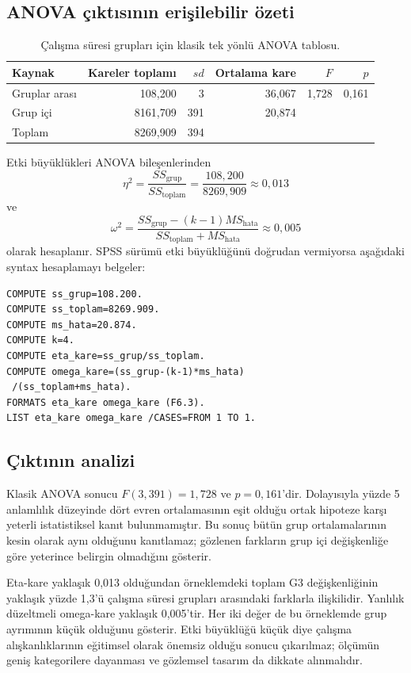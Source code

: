\subsection{ANOVA çıktısının erişilebilir özeti}

\begin{table}[htbp]
\centering
\caption{Çalışma süresi grupları için klasik tek yönlü ANOVA tablosu.}
\small
\begin{tabular}{@{}lrrrrr@{}}
\toprule
Kaynak & Kareler toplamı & $sd$ & Ortalama kare & $F$ & $p$ \\
\midrule
Gruplar arası & 108,200 & 3 & 36,067 & 1,728 & 0,161 \\
Grup içi & 8161,709 & 391 & 20,874 & & \\
Toplam & 8269,909 & 394 & & & \\
\bottomrule
\end{tabular}
\end{table}

Etki büyüklükleri ANOVA bileşenlerinden
\[
\eta^2=\frac{SS_{\mathrm{grup}}}{SS_{\mathrm{toplam}}}
=\frac{108{,}200}{8269{,}909}\approx0{,}013
\]
ve
\[
\omega^2=
\frac{SS_{\mathrm{grup}}-(k-1)MS_{\mathrm{hata}}}
{SS_{\mathrm{toplam}}+MS_{\mathrm{hata}}}
\approx0{,}005
\]
olarak hesaplanır. SPSS sürümü etki büyüklüğünü doğrudan vermiyorsa aşağıdaki
syntax hesaplamayı belgeler:

\begin{lstlisting}[language={}]
COMPUTE ss_grup=108.200.
COMPUTE ss_toplam=8269.909.
COMPUTE ms_hata=20.874.
COMPUTE k=4.
COMPUTE eta_kare=ss_grup/ss_toplam.
COMPUTE omega_kare=(ss_grup-(k-1)*ms_hata)
 /(ss_toplam+ms_hata).
FORMATS eta_kare omega_kare (F6.3).
LIST eta_kare omega_kare /CASES=FROM 1 TO 1.
\end{lstlisting}

\subsection{Çıktının analizi}

Klasik ANOVA sonucu $F(3,391)=1{,}728$ ve $p=0{,}161$'dir. Dolayısıyla yüzde
5 anlamlılık düzeyinde dört evren ortalamasının eşit olduğu ortak hipoteze
karşı yeterli istatistiksel kanıt bulunmamıştır. Bu sonuç bütün grup
ortalamalarının kesin olarak aynı olduğunu kanıtlamaz; gözlenen farkların grup
içi değişkenliğe göre yeterince belirgin olmadığını gösterir.

Eta-kare yaklaşık 0,013 olduğundan örneklemdeki toplam G3 değişkenliğinin
yaklaşık yüzde 1,3'ü çalışma süresi grupları arasındaki farklarla ilişkilidir.
Yanlılık düzeltmeli omega-kare yaklaşık 0,005'tir. Her iki değer de bu
örneklemde grup ayrımının küçük olduğunu gösterir. Etki büyüklüğü küçük diye
çalışma alışkanlıklarının eğitimsel olarak önemsiz olduğu sonucu çıkarılmaz;
ölçümün geniş kategorilere dayanması ve gözlemsel tasarım da dikkate
alınmalıdır.

